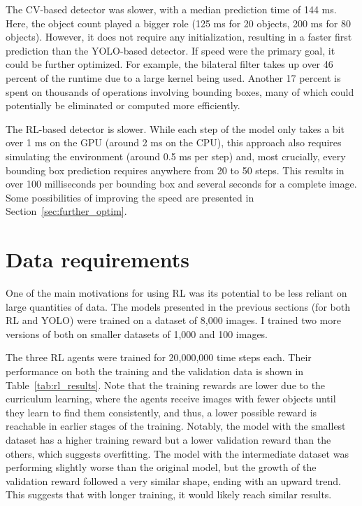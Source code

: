\documentclass[
  digital,     %
  oneside,     %
  nosansbold,  %
  nocolorbold, %
  lof,         %
  lot,         %
]{fithesis4}
\begin{document}
The CV-based detector was slower, with a median prediction time of 144 ms. Here, the object count played a bigger role (125 ms for 20 objects, 200 ms for 80 objects). However, it does not require any initialization, resulting in a faster first prediction than the YOLO-based detector. If speed were the primary goal, it could be further optimized. For example, the bilateral filter takes up over 46 percent of the runtime due to a large kernel being used. Another 17 percent is spent on thousands of operations involving bounding boxes, many of which could potentially be eliminated or computed more efficiently.

The RL-based detector is slower. While each step of the model only takes a bit over 1 ms on the GPU (around 2 ms on the CPU), this approach also requires simulating the environment (around 0.5 ms per step) and, most crucially, every bounding box prediction requires anywhere from 20 to 50 steps. This results in over 100 milliseconds per bounding box and several seconds for a complete image. Some possibilities of improving the speed are presented in Section~\ref{sec:further_optim}.


\section{Data requirements}
\label{sec:data_req}

One of the main motivations for using RL was its potential to be less reliant on large quantities of data. The models presented in the previous sections (for both RL and YOLO) were trained on a dataset of 8,000 images. I trained two more versions of both on smaller datasets of 1,000 and 100 images.

The three RL agents were trained for 20,000,000 time steps each. Their performance on both the training and the validation data is shown in Table~\ref{tab:rl_results}. Note that the training rewards are lower due to the curriculum learning, where the agents receive images with fewer objects until they learn to find them consistently, and thus, a lower possible reward is reachable in earlier stages of the training. Notably, the model with the smallest dataset has a higher training reward but a lower validation reward than the others, which suggests overfitting. The model with the intermediate dataset was performing slightly worse than the original model, but the growth of the validation reward followed a very similar shape, ending with an upward trend. This suggests that with longer training, it would likely reach similar results.
\end{document}
